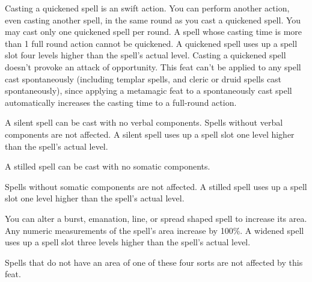 {Casting a quickened spell is an swift action. You can perform another action, even casting another spell, in the same round as you cast a quickened spell. You may cast only one quickened spell per round. A spell whose casting time is more than 1 full round action cannot be quickened. A quickened spell uses up a spell slot four levels higher than the spell's actual level. Casting a quickened spell doesn't provoke an attack of opportunity.}
{}
{This feat can't be applied to any spell cast spontaneously (including templar spells, and cleric or druid spells cast spontaneously), since applying a metamagic feat to a spontaneously cast spell automatically increases the casting time to a full-round action.}

{A silent spell can be cast with no verbal components. Spells without verbal components are not affected. A silent spell uses up a spell slot one level higher than the spell's actual level.}

{A stilled spell can be cast with no somatic components.

Spells without somatic components are not affected. A stilled spell uses up a spell slot one level higher than the spell's actual level.}

{You can alter a burst, emanation, line, or spread shaped spell to increase its area. Any numeric measurements of the spell's area increase by 100\%. A widened spell uses up a spell slot three levels higher than the spell's actual level.

Spells that do not have an area of one of these four sorts are not affected by this feat.}
